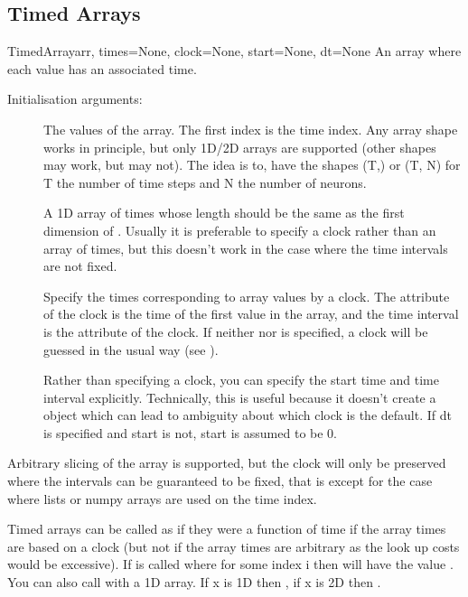 \documentclass[letterpaper,10pt,english]{manual}
\begin{document}
\subsection{Timed Arrays}

\hypertarget{brian.TimedArray}{}\begin{classdesc}{TimedArray}{arr, times=None, clock=None, start=None, dt=None}
An array where each value has an associated time.

Initialisation arguments:
\begin{description}
\item[] \leavevmode
The values of the array. The first index is the time index. Any
array shape works in principle, but only 1D/2D arrays are
supported (other shapes may work, but may not). The idea is to,
have the shapes (T,) or (T, N) for T the number of time steps and
N the number of neurons.

\item[] \leavevmode
A 1D array of times whose length should be the same as the first
dimension of . Usually it is preferable to specify a
clock rather than an array of times, but this doesn't work in
the case where the time intervals are not fixed.

\item[] \leavevmode
Specify the times corresponding to array values by a clock. The
 attribute of the clock is the time of the first value
in the array, and the time interval is the  attribute of
the clock. If neither  nor  is specified, a
clock will be guessed in the usual way (see \hyperlink{brian.Clock}{}).

\item[] \leavevmode
Rather than specifying a clock, you can specify the start time
and time interval explicitly. Technically, this is useful
because it doesn't create a \hyperlink{brian.Clock}{} object which can
lead to ambiguity about which clock is the default. If dt is
specified and start is not, start is assumed to be 0.

\end{description}

Arbitrary slicing of the array is supported, but the clock will only
be preserved where the intervals can be guaranteed to be fixed, that
is except for the case where lists or numpy arrays are used on the
time index.

Timed arrays can be called as if they were a function of time if the
array times are based on a clock (but not if the array times are
arbitrary as the look up costs would be excessive). If  is called
where  for some index i then  will
have the value . You can also call  with  a 1D array.
If x is 1D then , if x is 2D then .


\end{classdesc}
\end{document}
